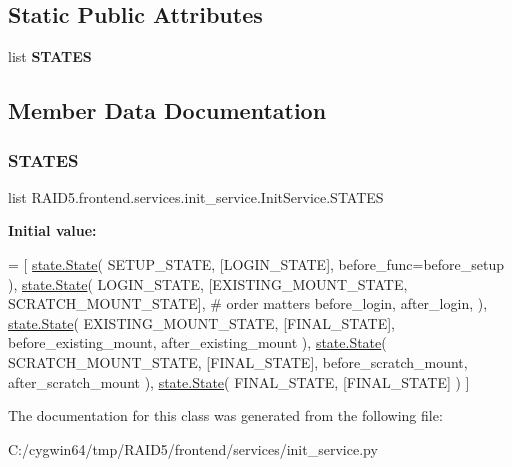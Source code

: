 \subsection*{Static Public Attributes}
\begin{DoxyCompactItemize}
\item 
list {\bfseries S\+T\+A\+T\+ES}
\end{DoxyCompactItemize}


\subsection{Member Data Documentation}
\mbox{\label{class_r_a_i_d5_1_1frontend_1_1services_1_1init__service_1_1_init_service_aeede04bcc77840ea29cbfa27f24c24cd}} 
\subsubsection{\texorpdfstring{S\+T\+A\+T\+ES}{STATES}}
{\footnotesize\ttfamily list R\+A\+I\+D5.\+frontend.\+services.\+init\+\_\+service.\+Init\+Service.\+S\+T\+A\+T\+ES\hspace{0.3cm}{\ttfamily [static]}}

{\bfseries Initial value\+:}
\begin{DoxyCode}
=  [
        \hyperlink{classstate_1_1_state}{state.State}(
            SETUP\_STATE,
            [LOGIN\_STATE],
            before\_func=before\_setup
        ),
        \hyperlink{classstate_1_1_state}{state.State}(
            LOGIN\_STATE,
            [EXISTING\_MOUNT\_STATE, SCRATCH\_MOUNT\_STATE],  \textcolor{comment}{# order matters}
            before\_login,
            after\_login,
        ),
        \hyperlink{classstate_1_1_state}{state.State}(
            EXISTING\_MOUNT\_STATE,
            [FINAL\_STATE],
            before\_existing\_mount,
            after\_existing\_mount
        ),
        \hyperlink{classstate_1_1_state}{state.State}(
            SCRATCH\_MOUNT\_STATE,
            [FINAL\_STATE],
            before\_scratch\_mount,
            after\_scratch\_mount
        ),
        \hyperlink{classstate_1_1_state}{state.State}(
            FINAL\_STATE,
            [FINAL\_STATE]
        )
    ]
\end{DoxyCode}


The documentation for this class was generated from the following file\+:\begin{DoxyCompactItemize}
\item 
C\+:/cygwin64/tmp/\+R\+A\+I\+D5/frontend/services/init\+\_\+service.\+py\end{DoxyCompactItemize}
